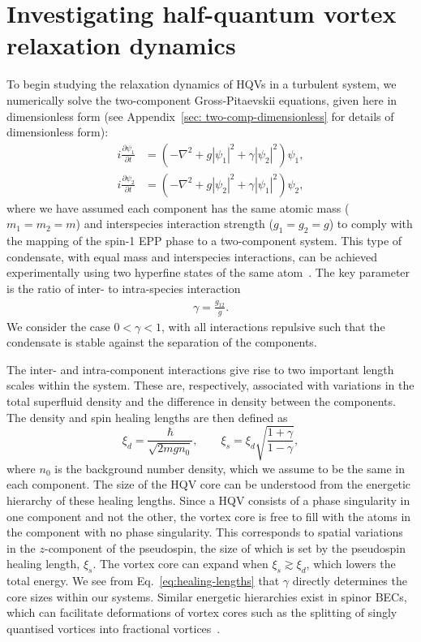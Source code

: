 \section{Investigating half-quantum vortex relaxation dynamics}
To begin studying the relaxation dynamics of HQVs in a turbulent system, we
numerically solve the two-component Gross-Pitaevskii equations, given here in
dimensionless form (see Appendix~\ref{sec: two-comp-dimensionless} for details
of dimensionless form):
\begin{equation}\label{eq: dimensionless-two-comp-GPEs}
    \begin{aligned}
        i\frac{\partial \psi_1}{\partial t} & = (-\nabla^2 + g|\psi_1|^2
        + \gamma|\psi_2|^2)\psi_1,                                       \\
        i\frac{\partial \psi_2}{\partial t} & = (-\nabla^2 + g|\psi_2|^2
        + \gamma|\psi_1|^2)\psi_2,
    \end{aligned}
\end{equation}
where we have assumed each component has the same atomic mass (\(m_1=m_2=m\))
and interspecies interaction strength (\(g_1=g_2=g\)) to comply with the mapping
of the spin-1 EPP phase to a two-component system.
This type of condensate, with equal mass and interspecies interactions, can be
achieved experimentally using two hyperfine states of the same
atom~\cite{Myatt1997, Hall1998}.
The key parameter is the ratio of inter- to intra-species interaction
\begin{align}
    \gamma = \frac{g_{12}}{g}.
\end{align}
We consider the case \(0 < \gamma < 1\), with all interactions repulsive such
that the condensate is stable against the separation of the components.

The inter- and intra-component interactions give rise to two important length
scales within the system.
These are, respectively, associated with variations in the total superfluid
density and the difference in density between the components.
The density and spin healing lengths are then defined as~\cite{Eto2011}
\begin{equation}
    \xi_d = \frac{\hbar}{\sqrt{2mgn_0}}, \qquad
    \xi_s = \xi_d \sqrt{\frac{1 + \gamma}{1 - \gamma}},
    \label{eq:healing-lengths}
\end{equation}
where \(n_0\) is the background number density, which we assume to be the same
in each component.
The size of the HQV core can be understood from the energetic hierarchy of
these healing lengths.
Since a HQV consists of a phase singularity in one component and not the other,
the vortex core is free to fill with the atoms in the component with no phase
singularity.
This corresponds to spatial variations in the \( z \)-component of the
pseudospin, the size of which is set by the pseudospin healing length,
\(\xi_s\).
The vortex core can expand when \(\xi_s \gtrsim \xi_d\), which lowers
the total energy.
We see from Eq.~\eqref{eq:healing-lengths} that \(\gamma \) directly determines
the core sizes within our systems.
Similar energetic hierarchies exist in spinor BECs, which can facilitate
deformations of vortex cores such as the splitting of singly quantised vortices
into fractional vortices~\cite{Seo2015}.

